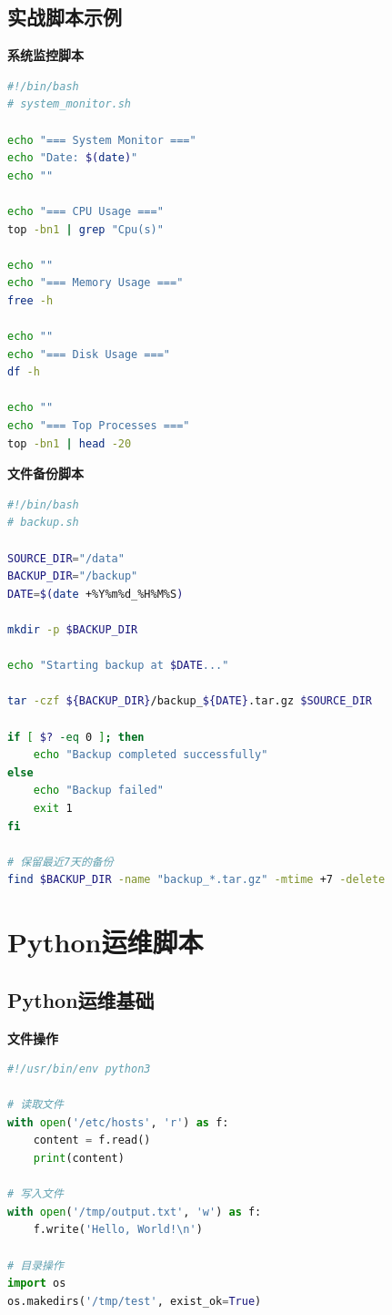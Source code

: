 \documentclass[12pt,UTF8]{ctexbook}
\begin{document}
\subsection*{实战脚本示例}

\textbf{系统监控脚本}
\begin{lstlisting}[language=bash]
#!/bin/bash
# system_monitor.sh

echo "=== System Monitor ==="
echo "Date: $(date)"
echo ""

echo "=== CPU Usage ==="
top -bn1 | grep "Cpu(s)"

echo ""
echo "=== Memory Usage ==="
free -h

echo ""
echo "=== Disk Usage ==="
df -h

echo ""
echo "=== Top Processes ==="
top -bn1 | head -20
\end{lstlisting}

\textbf{文件备份脚本}
\begin{lstlisting}[language=bash]
#!/bin/bash
# backup.sh

SOURCE_DIR="/data"
BACKUP_DIR="/backup"
DATE=$(date +%Y%m%d_%H%M%S)

mkdir -p $BACKUP_DIR

echo "Starting backup at $DATE..."

tar -czf ${BACKUP_DIR}/backup_${DATE}.tar.gz $SOURCE_DIR

if [ $? -eq 0 ]; then
    echo "Backup completed successfully"
else
    echo "Backup failed"
    exit 1
fi

# 保留最近7天的备份
find $BACKUP_DIR -name "backup_*.tar.gz" -mtime +7 -delete
\end{lstlisting}

\section{Python运维脚本}
\label{sec:python-scripts}

\subsection*{Python运维基础}

\textbf{文件操作}
\begin{lstlisting}[language=python]
#!/usr/bin/env python3

# 读取文件
with open('/etc/hosts', 'r') as f:
    content = f.read()
    print(content)

# 写入文件
with open('/tmp/output.txt', 'w') as f:
    f.write('Hello, World!\n')

# 目录操作
import os
os.makedirs('/tmp/test', exist_ok=True)
\end{lstlisting}
\end{document}
